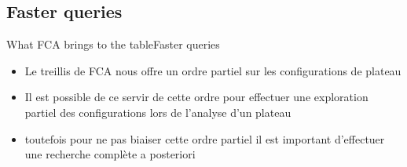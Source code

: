 %
\subsection{Faster queries}
\begin{frame}{What FCA brings to the table}{Faster queries}


  \begin{itemize}
    \item Le treillis de FCA nous offre un ordre partiel sur les
      configurations de plateau
    \item Il est possible de ce servir de cette ordre pour effectuer
      une exploration partiel des configurations lors de l'analyse
      d'un plateau
    \item toutefois pour ne pas biaiser cette ordre partiel il est
      important d'effectuer une recherche complète a posteriori
    
  \end{itemize}



\end{frame}

%
